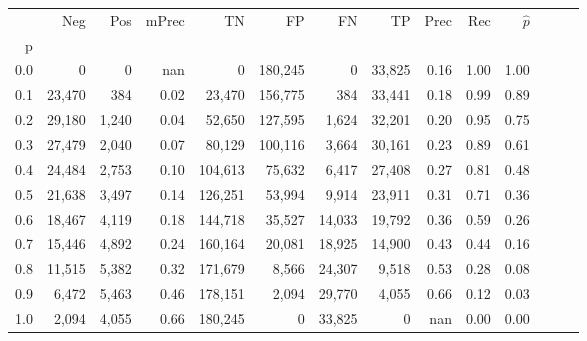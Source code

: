 \begin{tabular}{rrrrrrrrrrrrrr}
\toprule
{} &     Neg &    Pos & mPrec &       TN &       FP &      FN &      TP &  Prec &   Rec & $\hat{p}$ \\
p   &         &        &       &          &          &         &         &       &       &           \\
\midrule
0.0 &       0 &      0 &   nan &        0 &  180,245 &       0 &  33,825 &  0.16 &  1.00 &      1.00 \\
0.1 &  23,470 &    384 &  0.02 &   23,470 &  156,775 &     384 &  33,441 &  0.18 &  0.99 &      0.89 \\
0.2 &  29,180 &  1,240 &  0.04 &   52,650 &  127,595 &   1,624 &  32,201 &  0.20 &  0.95 &      0.75 \\
0.3 &  27,479 &  2,040 &  0.07 &   80,129 &  100,116 &   3,664 &  30,161 &  0.23 &  0.89 &      0.61 \\
0.4 &  24,484 &  2,753 &  0.10 &  104,613 &   75,632 &   6,417 &  27,408 &  0.27 &  0.81 &      0.48 \\
0.5 &  21,638 &  3,497 &  0.14 &  126,251 &   53,994 &   9,914 &  23,911 &  0.31 &  0.71 &      0.36 \\
0.6 &  18,467 &  4,119 &  0.18 &  144,718 &   35,527 &  14,033 &  19,792 &  0.36 &  0.59 &      0.26 \\
0.7 &  15,446 &  4,892 &  0.24 &  160,164 &   20,081 &  18,925 &  14,900 &  0.43 &  0.44 &      0.16 \\
0.8 &  11,515 &  5,382 &  0.32 &  171,679 &    8,566 &  24,307 &   9,518 &  0.53 &  0.28 &      0.08 \\
0.9 &   6,472 &  5,463 &  0.46 &  178,151 &    2,094 &  29,770 &   4,055 &  0.66 &  0.12 &      0.03 \\
1.0 &   2,094 &  4,055 &  0.66 &  180,245 &        0 &  33,825 &       0 &   nan &  0.00 &      0.00 \\
\bottomrule
\end{tabular}
